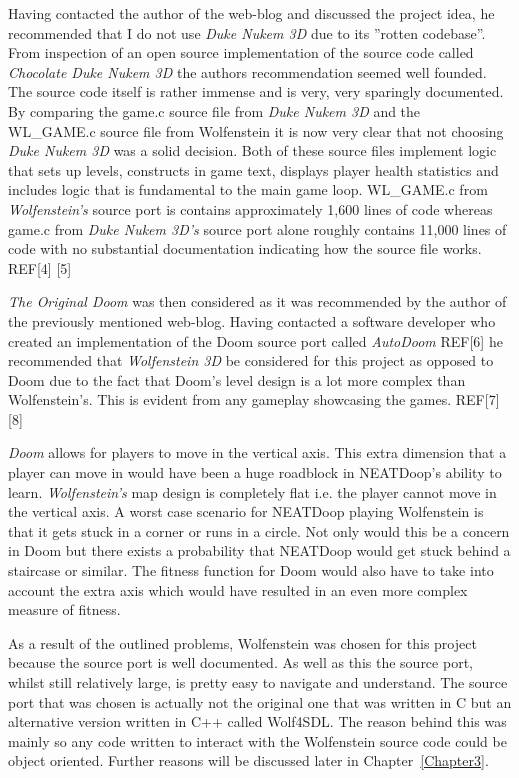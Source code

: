 \documentclass[]{Learning-to-Play-Wolfenstein-thesis}
\begin{document}
Having contacted the author of the web-blog and discussed the project idea, he recommended that I do not use \textit{Duke Nukem 3D} due to its ”rotten codebase”. From inspection of an open source implementation of the source code called \textit{Chocolate Duke Nukem 3D} the authors recommendation seemed well founded. The source code itself is rather immense and is very, very sparingly documented. By comparing the game.c source file from \textit{Duke Nukem 3D} and the WL\_GAME.c source file from Wolfenstein it is now very clear that not choosing \textit{Duke Nukem 3D} was a solid decision. Both of these source files implement logic that sets up levels, constructs in game text, displays player health statistics and includes logic that is fundamental to the main game loop. WL\_GAME.c from \textit{Wolfenstein’s} source port is contains approximately 1,600 lines of code whereas game.c from \textit{Duke Nukem 3D’s} source port alone roughly contains 11,000 lines of code with no substantial documentation indicating how the source file works. REF[4] [5]

\textit{The Original Doom} was then considered as it was recommended by the author of the previously mentioned web-blog. Having contacted a software developer who created an implementation of the Doom source port called \textit{AutoDoom} REF[6] he recommended that \textit{Wolfenstein 3D} be considered for this project as opposed to Doom due to the fact that Doom’s level design is a lot more complex than Wolfenstein’s. This is evident from any gameplay showcasing the games. REF[7] [8] 

\textit{Doom} allows for players to move in the vertical axis. This extra dimension that a player can move in would have been a huge roadblock in NEATDoop’s ability to learn. \textit{Wolfenstein’s} map design is completely flat i.e. the player cannot move in the vertical axis. A worst case scenario for NEATDoop playing Wolfenstein is that it gets stuck in a corner or runs in a circle. Not only would this be a concern in Doom but there exists a probability that NEATDoop would get stuck behind a staircase or similar. The fitness function for Doom would also have to take into account the extra axis which would have resulted in an even more complex measure of fitness.

As a result of the outlined problems, Wolfenstein was chosen for this project because the source port is well documented. As well as this the source port, whilst still relatively large, is pretty easy to navigate and understand. The source port that was chosen is actually not the original one that was written in C but an alternative version written in C++ called Wolf4SDL. The reason behind this was mainly so any code written to interact with the Wolfenstein source code could be object oriented. Further reasons will be discussed later in Chapter~\ref{Chapter3}.
\end{document}
